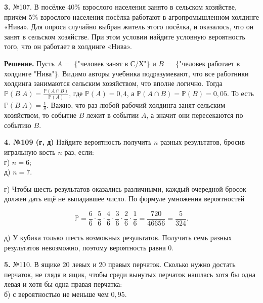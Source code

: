 \begin{task}\label{task-homework-3}
\textbf{3.} №107. В посёлке 40\% взрослого населения занято в сельском хозяйстве, причём 5\% взрослого населения посёлка работают в агропромышленном холдинге «Нива». Для опроса случайно выбран житель этого посёлка, и оказалось, что он занят в сельском хозяйстве. При этом условии найдите условную вероятность того, что он работает в холдинге «Нива».\\
\end{task}

\begin{solution}\label{solution-conditional-probability-homework-3-method-1}
\textbf{Решение.} Пусть $A =$ \{"человек занят в С/Х"\} и $B =$ \{"человек работает в холдинге "Нива"\}. Видимо авторы учебника подразумевают, что все работники холдинга занимаются сельским хозяйством, что вполне логично. Тогда $\mathbb{P}(B|A)=\frac{\mathbb{P}(A\cap B)}{\mathbb{P}(A)}$, где $\mathbb{P}(A) = 0,4$, а $\mathbb{P}(A\cap B) = \mathbb{P}(B) = 0,05$. То есть $\mathbb{P}(B|A) = \frac{1}{8}$. Важно, что раз любой рабочий холдинга занят сельским хозяйством, то событие $B$ лежит в событии $A$, а значит они пересекаются по событию $B$.
\end{solution}

\begin{task}\label{task-homework-4}
\textbf{4. №109 (г, д)} Найдите вероятность получить $n$ разных результатов, бросив игральную кость $n$ раз, если:\\
 г) $n=6$;\\
 д) $n=7$.
\end{task}

\begin{solution}\label{solution-conditional-probability-homework-4}
г) Чтобы шесть результатов оказались различными, каждый очередной бросок должен дать ещё не выпадавшее число. По формуле умножения вероятностей

\[\mathbb P=\frac66\cdot\frac56\cdot\frac46\cdot\frac36\cdot\frac26\cdot\frac16=\frac{720}{46656}=\frac5{324}.\]

д) У кубика только шесть возможных результатов. Получить семь разных результатов невозможно, поэтому вероятность равна 0.
\end{solution}

\begin{task}\label{task-homework-5}
\textbf{5.} №110. В ящике 20 левых и 20 правых перчаток. Сколько нужно достать перчаток, не глядя в ящик, чтобы среди вынутых перчаток нашлась хотя бы одна левая и хотя бы одна правая перчатка:\\
 б) с вероятностью не меньше чем $0,95$.\\
\end{task}

